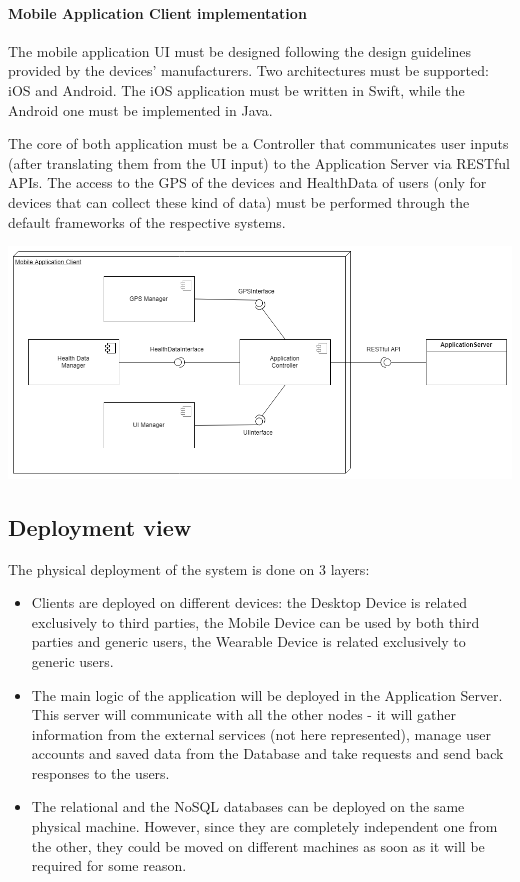 \paragraph{Mobile Application Client implementation}
The mobile application UI must be designed following the design guidelines provided by the devices’ manufacturers. Two architectures must be supported: iOS and Android. The iOS application must be written in Swift, while the Android one must be implemented in Java.

The core of both application must be a Controller that communicates user inputs (after translating them from the UI input) to the Application Server via RESTful APIs. The access to the GPS of the devices and HealthData of users (only for devices that can collect these kind of data) must be performed through the default frameworks of the respective systems.

\begin{center}
\includegraphics[scale=0.45]{sections/diagrams/mac.png}
\newline
{}
\end{center}

\subsection{Deployment view}
The physical deployment of the system is done on 3 layers:
\begin{itemize}
\item Clients are deployed on different devices: the Desktop Device is related exclusively to third parties, the Mobile Device can be used by both third parties and generic users, the Wearable Device is related exclusively to generic users.

\item  The main logic of the application will be deployed in the Application Server. This server will communicate with all the other nodes - it will gather information from the external services (not here represented), manage user accounts and saved data from the Database and take requests and send back responses to the users.

\item The relational and the NoSQL databases can be deployed on the same physical machine. However, since they are completely independent one from the other, they could be moved on different machines as soon as it will be required for some reason.
\end{itemize}

